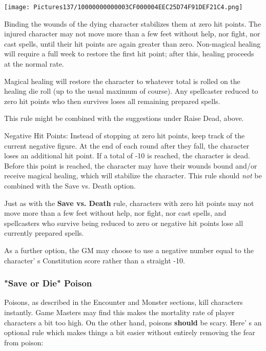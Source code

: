 \documentclass[a4paper,twoside,openany,10pt]{book}
\begin{document}
\begin{multicols}{2}
\begin{center}
	\texttt{[image: Pictures137/10000000000003CF000004EEC25D74F91DEF21C4.png]}
\end{center}

Binding the wounds of the dying character stabilizes them at zero hit points. The injured character may not move more than a few feet without help, nor fight, nor cast spells, until their hit points are again greater than zero. Non-magical healing will require a full week to restore the first hit point; after this, healing proceeds at the normal rate.

Magical healing will restore the character to whatever total is rolled on the healing die roll (up to the usual maximum of course).  Any spellcaster reduced to zero hit points who then survives loses all remaining prepared spells.

This rule might be combined with the suggestions under Raise Dead, above.

Negative Hit Points: Instead of stopping at zero hit points, keep track of the current negative figure. At the end of each round after they fall, the character loses an additional hit point. If a total of -10 is  reached, the character is dead. Before this point is reached, the character may have their wounds bound and/or receive magical healing, which will stabilize the character. This rule should \emph{not} be combined with the Save vs. Death option.

Just as with the \textbf{Save vs. Death} rule, characters with zero hit points may not move more than a few feet without help, nor fight, nor cast spells, and spellcasters who survive being reduced to zero or negative hit points lose all currently prepared spells.

As a further option, the GM may choose to use a negative number equal to the character' s Constitution score rather than a straight -10.

\subsubsection{"Save or Die" Poison}\label{save-or-die-poison}

Poisons, as described in the Encounter and Monster sections, kill characters instantly. Game Masters may find this makes the mortality rate of player characters a bit too high. On the other hand, poisons \textbf{should} be scary. Here' s an optional rule which makes things a bit easier without entirely removing the fear from poison:


\end{multicols}
\end{document}
